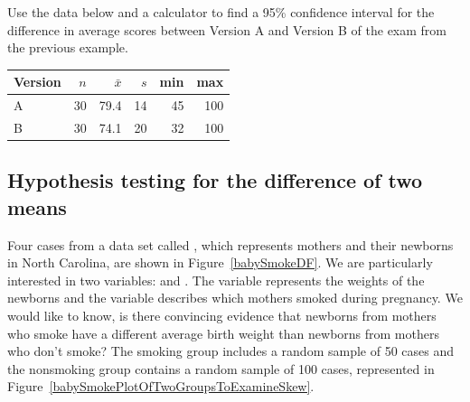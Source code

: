 \begin{exercisewrap}
\begin{nexercise}Use the data below and a calculator to find a 95\% confidence interval for the difference in average scores between Version A and Version B of the exam from the previous example.\footnotemark
\begin{center}
\begin{tabular}{l rrrrr}
\hline
Version\hspace{2mm}	& $n$	& $\bar{x}$	& $s$	& min	& max  \\
\hline
A		& 30		& 79.4		& 14 	& 45		& 100 \\
B		& 30		& 74.1		& 20		& 32		& 100 \\
\hline
\end{tabular}
\end{center}
\end{nexercise}
\end{exercisewrap}




\subsection{Hypothesis testing for the difference of two means}



Four cases from a data set called , which represents mothers and their newborns in North Carolina, are shown in Figure~\ref{babySmokeDF}. We are particularly interested in two variables:  and . The  variable represents the weights of the newborns and the  variable describes which mothers smoked during pregnancy. We would like to know, is there convincing evidence that newborns from mothers who smoke have a different average birth weight than newborns from mothers who don't smoke? The smoking group includes a random sample of 50 cases and the nonsmoking group contains a random sample of 100 cases, represented in Figure~\ref{babySmokePlotOfTwoGroupsToExamineSkew}.

